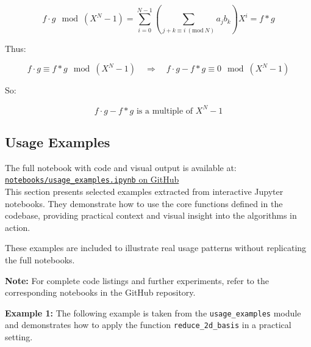 \documentclass[a4paper,12pt]{article}
\begin{document}
\[
f \cdot g \mod (X^N - 1) = \sum_{i=0}^{N-1} \left( \sum_{j + k \equiv i \ (\mathrm{mod}\ N)} a_j b_k \right) X^i = f * g
\]

Thus:

\[
f \cdot g \equiv f * g \mod (X^N - 1)
\quad \Rightarrow \quad
f \cdot g - f * g \equiv 0 \mod (X^N - 1)
\]

So:

\[
f \cdot g - f * g \text{ is a multiple of } X^N - 1
\]


\newpage







\subsection{Usage Examples}
\noindent
The full notebook with code and visual output is available at:\\
\href{https://github.com/SanyaKor/Cryptanalysis/blob/main/notebooks/usage_examples.ipynb}{\texttt{notebooks/usage\_examples.ipynb} on GitHub}
\\

This section presents selected examples extracted from interactive Jupyter notebooks.  
They demonstrate how to use the core functions defined in the codebase,  
providing practical context and visual insight into the algorithms in action.

These examples are included to illustrate real usage patterns without replicating the full notebooks.  

\vspace{1em}
\noindent
\textbf{Note:} For complete code listings and further experiments, refer to the corresponding notebooks in the GitHub repository.


\noindent
\textbf{Example 1:}  
The following example is taken from the
\texttt{usage\_examples} module  
and demonstrates how to apply the function
\texttt{reduce\_2d\_basis} in a practical setting.






\end{document}
